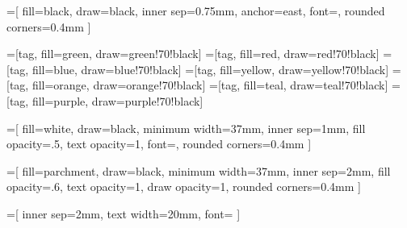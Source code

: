 
=[
        fill=black, 
        draw=black, 
        inner sep=0.75mm, 
        anchor=east,
        font=\sffamily\fontsize{4}{4}\selectfont\color{white},
        rounded corners=0.4mm
]

=[tag, fill=green, draw=green!70!black]
=[tag, fill=red, draw=red!70!black]
=[tag, fill=blue, draw=blue!70!black]
=[tag, fill=yellow, draw=yellow!70!black]
=[tag, fill=orange, draw=orange!70!black]
=[tag, fill=teal, draw=teal!70!black]
=[tag, fill=purple, draw=purple!70!black]

=[
    fill=white, 
    draw=black, 
    minimum width=37mm, 
    inner sep=1mm, 
    fill opacity=.5,
    text opacity=1, 
    font=\sffamily\fontsize{7}{7}\selectfont,
    rounded corners=0.4mm
]
        
=[
    fill=parchment, 
    draw=black, 
    minimum width=37mm, 
    inner sep=2mm, 
    fill opacity=.6,
    text opacity=1, 
    draw opacity=1,
    rounded corners=0.4mm
]

=[
    inner sep=2mm, 
    text width=20mm, 
    font=\sffamily\fontsize{4}{4.5}\selectfont
]
